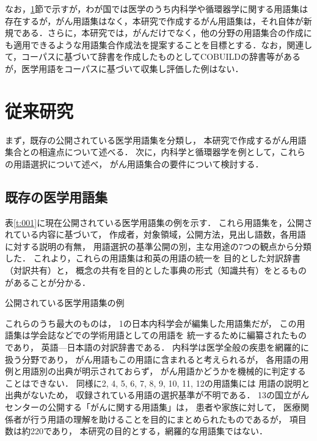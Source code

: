 \documentclass[japanese]{jnlp_1.4}
\begin{document}
なお，\ref{s:従来研究}節で示すが，わが国では医学のうち内科学や循環器学に関する用語集は存在するが，がん用語集はなく，本研究で作成するがん用語集は，それ自体が新規である．さらに，本研究では，がんだけでなく，他の分野の用語集合の作成にも適用できるような用語集合作成法を提案することを目標とする．なお，関連して，コーパスに基づいて辞書を作成したものとしてCOBUILDの辞書等があるが，医学用語をコーパスに基づいて収集し評価した例はない．



\section{従来研究}
\label{s:従来研究}

まず，既存の公開されている医学用語集を分類し，
本研究で作成するがん用語集合との相違点について述べる．
次に，内科学と循環器学を例として，これらの用語選択について述べ，
がん用語集合の要件について検討する．

\subsection{既存の医学用語集}
\label{s:既存の医学用語集}

表\ref{t:001}に現在公開されている医学用語集の例を示す．
これら用語集を，公開されている内容に基づいて，
作成者，対象領域，公開方法，見出し語数，各用語に対する説明の有無，
用語選択の基準公開の別，主な用途の7つの観点から分類した．
これより，これらの用語集は和英の用語の統一を
目的とした対訳辞書（対訳共有）と，
概念の共有を目的とした事典の形式（知識共有）をとるものがあることが分かる．

\begin{table}[b]
 \caption{公開されている医学用語集の例}
 \begin{center}

 \end{center}
 \label{t:001}
\end{table}

これらのうち最大のものは，
1の日本内科学会が編集した用語集だが，
この用語集は学会誌などでの学術用語としての用語を
統一するために編纂されたものであり，
英語—日本語の対訳辞書である．
内科学は医学全般の疾患を網羅的に扱う分野であり，
がん用語もこの用語に含まれると考えられるが，
各用語の用例と用語別の出典が明示されておらず，
がん用語かどうかを機械的に判定することはできない．
同様に2, 4, 5, 6, 7, 8, 9, 10, 11, 12の用語集には
用語の説明と出典がないため，
収録されている用語の選択基準が不明である．
13の国立がんセンターの公開する「がんに関する用語集」は，
患者や家族に対して，
医療関係者が行う用語の理解を助けることを目的にまとめられたものであるが，
項目数は約220であり，
本研究の目的とする，網羅的な用語集ではない．
\end{document}
